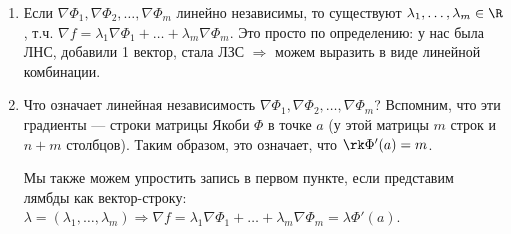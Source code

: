 \notice \begin{enumerate}
    \item Если $\nabla \Phi_1, \nabla \Phi_2, \dots, \nabla \Phi_m$ линейно независимы, то существуют $\lambda_1, \dots, \lambda_m \in \R$, т.ч. $\nabla f = \lambda_1 \nabla \Phi_1 + \dots + \lambda_m \nabla \Phi_m$.
    Это просто по определению: у нас была ЛНС, добавили 1 вектор, стала ЛЗС $\Rightarrow$ можем выразить в виде линейной комбинации.
    \item Что означает линейная независимость $\nabla \Phi_1, \nabla \Phi_2, \dots, \nabla \Phi_m$?
    Вспомним, что эти градиенты --- строки матрицы Якоби $\Phi$ в точке $a$ (у этой матрицы $m$ строк и $n+m$ столбцов).
    Таким образом, это означает, что $\rk \Phi'(a) = m$.
    
    Мы также можем упростить запись в первом пункте, если представим лямбды как вектор-строку: $\lambda = (\lambda_1, \dots, \lambda_m) \Longrightarrow \nabla f = \lambda_1 \nabla \Phi_1 + \dots + \lambda_m \nabla \Phi_m = \lambda \Phi'(a)$.
\end{enumerate}

